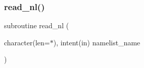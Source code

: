 \subsubsection{\texorpdfstring{read\+\_\+nl()}{read\_nl()}}
{\footnotesize\ttfamily subroutine read\+\_\+nl (\begin{DoxyParamCaption}\item[{character(len=$\ast$), intent(in)}]{namelist\+\_\+name }\end{DoxyParamCaption})}

